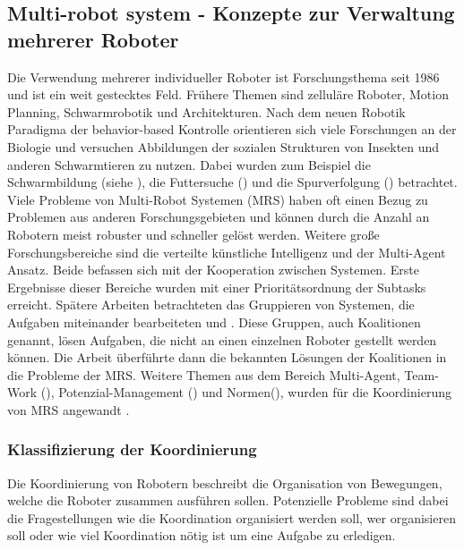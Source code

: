 \subsection{Multi-robot system - Konzepte zur Verwaltung mehrerer Roboter}
\label{sec:relatedwork-multirobots}
    
Die Verwendung mehrerer individueller Roboter ist Forschungsthema seit 1986 und ist ein weit gestecktes Feld. Frühere Themen sind zelluläre Roboter, Motion Planning, Schwarmrobotik und Architekturen. Nach dem neuen Robotik Paradigma der behavior-based Kontrolle orientieren sich viele Forschungen an der Biologie und versuchen Abbildungen der sozialen Strukturen von Insekten und anderen Schwarmtieren zu nutzen.\cite{parker2003current} Dabei wurden zum Beispiel die Schwarmbildung (siehe \cite{hayes2002self}), die Futtersuche (\cite{balch1999impact}) und die Spurverfolgung (\cite{vaughan2000whistling}) betrachtet. Viele Probleme von Multi-Robot Systemen (MRS) haben oft einen Bezug zu Problemen aus anderen Forschungsgebieten und können durch die Anzahl an Robotern meist robuster und schneller gelöst werden. Weitere große Forschungsbereiche sind die verteilte künstliche Intelligenz und der Multi-Agent Ansatz. Beide befassen sich mit der Kooperation zwischen Systemen. Erste Ergebnisse dieser Bereiche wurden mit einer Prioritätsordnung der Subtasks erreicht\cite{durfee1987coherent}. Spätere Arbeiten betrachteten das Gruppieren von Systemen, die Aufgaben miteinander bearbeiteten \cite{shehory1998methods} und \cite{lau2003task}. Diese Gruppen, auch Koalitionen genannt, lösen Aufgaben, die nicht an einen einzelnen Roboter gestellt werden können. Die Arbeit \cite{vig2005issues} überführte dann die bekannten Lösungen der Koalitionen in die Probleme der MRS. Weitere Themen aus dem Bereich Multi-Agent, Team-Work (\cite{pynadath2003automated}), Potenzial-Management (\cite{timm2003ontology}) und Normen(\cite{boella2002norms}), wurden für die Koordinierung von MRS angewandt \citep{lundh2006plan}.

\subsubsection{Klassifizierung der Koordinierung}
Die Koordinierung von Robotern beschreibt die Organisation von Bewegungen, welche die Roboter zusammen ausführen sollen. Potenzielle Probleme sind dabei die Fragestellungen wie die Koordination organisiert werden soll, wer organisieren soll oder wie viel Koordination nötig ist um eine Aufgabe zu erledigen.

